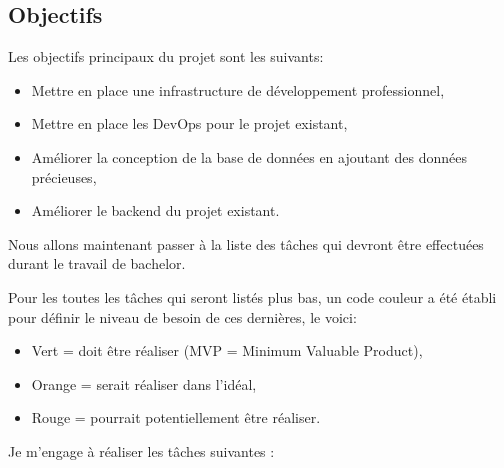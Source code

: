 \documentclass[
    iai, %
    il, %
]{heig-tb}
\begin{document}
\subsection{Objectifs}

Les objectifs principaux du projet sont les suivants:
\begin{itemize}
    \item Mettre en place une infrastructure de développement professionnel,
    \item Mettre en place les DevOps pour le projet existant,
    \item Améliorer la conception de la base de données en ajoutant des données précieuses,
    \item Améliorer le backend du projet existant.
\end{itemize}

Nous allons maintenant passer à la liste des tâches qui devront être
effectuées durant le travail de bachelor.

Pour les toutes les tâches qui seront listés plus bas, un code couleur a
été établi pour définir le niveau de besoin de ces dernières, le voici:

\begin{itemize}
    \item Vert = doit être réaliser (MVP = Minimum Valuable Product),
    \item Orange = serait réaliser dans l'idéal,
    \item Rouge = pourrait potentiellement être réaliser.
\end{itemize}

Je m'engage à réaliser les tâches suivantes :
\end{document}
